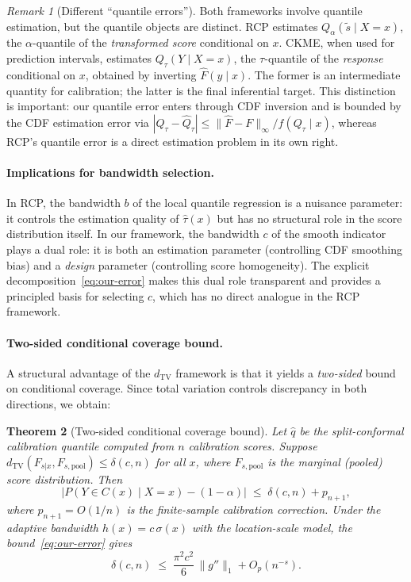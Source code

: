 \documentclass[11pt]{article}
\newtheorem{theorem}{Theorem}
\theoremstyle{remark}
\newtheorem{remark}[theorem]{Remark}
\begin{document}
\begin{remark}[Different ``quantile errors'']
\label{rem:quantile-errors}
Both frameworks involve quantile estimation, but the quantile objects
are distinct. RCP estimates $Q_\alpha(\tilde{s} \mid X=x)$, the
$\alpha$-quantile of the \emph{transformed score} conditional on $x$.
CKME, when used for prediction intervals, estimates
$Q_\tau(Y \mid X=x)$, the $\tau$-quantile of the \emph{response}
conditional on $x$, obtained by inverting $\hat F(y \mid x)$.
The former is an intermediate quantity for calibration; the latter is
the final inferential target. This distinction is important: our
quantile error enters through CDF inversion and is bounded by the
CDF estimation error via $|Q_\tau - \hat Q_\tau| \le \|\hat F - F\|_\infty / f(Q_\tau \mid x)$,
whereas RCP's quantile error is a direct estimation problem in its own
right.
\end{remark}

\paragraph{Implications for bandwidth selection.}
In RCP, the bandwidth $b$ of the local quantile regression is a
nuisance parameter: it controls the estimation quality of $\hat\tau(x)$
but has no structural role in the score distribution itself.
In our framework, the bandwidth $c$ of the smooth indicator plays a
dual role: it is both an estimation parameter (controlling CDF
smoothing bias) and a \emph{design} parameter (controlling score
homogeneity). The explicit decomposition~\eqref{eq:our-error}
makes this dual role transparent and provides a principled basis for
selecting $c$, which has no direct analogue in the RCP framework.

\paragraph{Two-sided conditional coverage bound.}
A structural advantage of the $d_{\mathrm{TV}}$ framework is that it
yields a \emph{two-sided} bound on conditional coverage. Since total
variation controls discrepancy in both directions, we obtain:

\begin{theorem}[Two-sided conditional coverage bound]
\label{prop:two-sided}%
Let $\hat{q}$ be the split-conformal calibration quantile computed
from $n$ calibration scores. Suppose
$d_{\mathrm{TV}}(F_{s|x}, F_{s,\mathrm{pool}}) \le \delta(c, n)$
for all $x$, where $F_{s,\mathrm{pool}}$ is the marginal (pooled)
score distribution. Then
\begin{equation}
\label{eq:two-sided}
  \bigl|P(Y \in C(x) \mid X = x) - (1 - \alpha)\bigr|
  \;\le\; \delta(c, n) + p_{n+1},
\end{equation}
where $p_{n+1} = O(1/n)$ is the finite-sample calibration correction.
Under the adaptive bandwidth $h(x) = c\,\sigma(x)$ with the
location-scale model, the bound~\eqref{eq:our-error} gives
\[
  \delta(c, n) \;\le\;
  \frac{\pi^2 c^2}{6}\,\|g''\|_1 + O_p(n^{-s}).
\]
\end{theorem}
\end{document}
